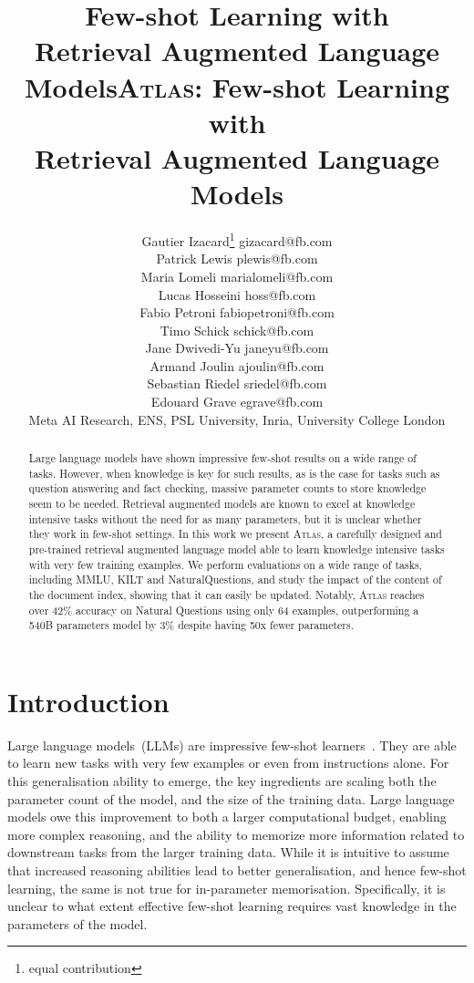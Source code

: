 \documentclass[10pt]{article} \usepackage[preprint]{tmlr}
\title{Few-shot Learning with \\ Retrieval Augmented Language Models}
\author{\name Gautier Izacard\thanks{equal contribution} \email gizacard@fb.com \\
  \name Patrick Lewis \email plewis@fb.com \\
  \name Maria Lomeli \email marialomeli@fb.com \\
  \name Lucas Hosseini \email hoss@fb.com \\
  \name Fabio Petroni \email fabiopetroni@fb.com \\
  \name Timo Schick \email schick@fb.com \\
  \name Jane Dwivedi-Yu \email janeyu@fb.com \\
  \name Armand Joulin \email ajoulin@fb.com \\
  \name Sebastian Riedel \email sriedel@fb.com \\
  \name Edouard Grave \email egrave@fb.com \\
  \addr  Meta AI Research,
   ENS, PSL University,
   Inria,
   University College London
}
\newcommand{\Atlas}{\textsc{Atlas}}
\begin{document}
\title{\Atlas{}: Few-shot Learning with \\ Retrieval Augmented Language Models}

\maketitle

\begin{abstract}Large language models have shown impressive few-shot results on a wide range of tasks.
  However, when knowledge is key for such results, as is the case for tasks such as question answering and fact checking, massive parameter counts to store knowledge seem to be needed.
  Retrieval augmented models are known to excel at knowledge intensive tasks without the need for as many parameters, but it is unclear whether they work in few-shot settings.
  In this work we present \Atlas{}, a carefully designed and pre-trained retrieval augmented language model able to learn knowledge intensive tasks with very few training examples.
  We perform evaluations on a wide range of tasks, including MMLU, KILT and NaturalQuestions, and study the impact of the content of the document index, showing that it can easily be updated.
  Notably, \Atlas{} reaches over 42\% accuracy on Natural Questions using only 64 examples, outperforming a 540B parameters model by 3\% despite having 50x fewer parameters.
\end{abstract}

\section{Introduction}
Large language models~(LLMs) are impressive few-shot learners~\citep{brown2020gpt3,rae2021goepher,hoffmann2022chinchilla,chowdhery2022palm}.
They are able to learn new tasks with very few examples or even from instructions alone.
For this generalisation ability to emerge, the key ingredients are scaling both the parameter count of the model, and the size of the training data.
Large language models owe this improvement to both a larger computational budget, enabling more complex reasoning, and the ability to memorize more information related to downstream tasks from the larger training data.
While it is intuitive to assume that increased reasoning abilities lead to better generalisation, and hence few-shot learning, the same is not true for in-parameter memorisation.
Specifically, it is unclear to what extent effective few-shot learning requires vast knowledge in the parameters of the model.
\end{document}
